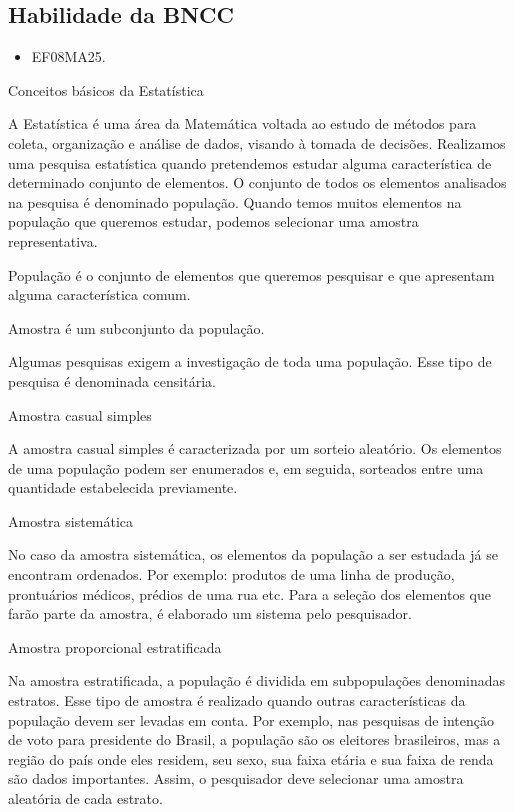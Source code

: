 {\subsection{Habilidade da BNCC}

\begin{itemize}
\item EF08MA25.
\end{itemize}

Conceitos básicos da Estatística

A Estatística é uma área da Matemática voltada ao estudo de métodos para
coleta, organização e análise de dados, visando à tomada de decisões.
Realizamos uma pesquisa estatística quando pretendemos estudar alguma
característica de determinado conjunto de elementos. O conjunto de todos
os elementos analisados na pesquisa é denominado população. Quando temos
muitos elementos na população que queremos estudar, podemos selecionar
uma amostra representativa.

População é o conjunto de elementos que queremos pesquisar e que
apresentam alguma característica comum.

Amostra é um subconjunto da população.

Algumas pesquisas exigem a investigação de toda uma população. Esse tipo
de pesquisa é denominada censitária.

Amostra casual simples

A amostra casual simples é caracterizada por um sorteio aleatório. Os
elementos de uma população podem ser enumerados e, em seguida, sorteados
entre uma quantidade estabelecida previamente.

Amostra sistemática

No caso da amostra sistemática, os elementos da população a ser estudada
já se encontram ordenados. Por exemplo: produtos de uma linha de
produção, prontuários médicos, prédios de uma rua etc. Para a seleção
dos elementos que farão parte da amostra, é elaborado um sistema pelo
pesquisador.

Amostra proporcional estratificada

Na amostra estratificada, a população é dividida em subpopulações
denominadas estratos. Esse tipo de amostra é realizado quando outras
características da população devem ser levadas em conta. Por exemplo,
nas pesquisas de intenção de voto para presidente do Brasil, a população
são os eleitores brasileiros, mas a região do país onde eles residem,
seu sexo, sua faixa etária e sua faixa de renda são dados importantes.
Assim, o pesquisador deve selecionar uma amostra aleatória de cada
estrato.

}
